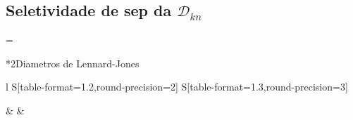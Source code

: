 \documentclass[\mainfilename]{subfiles}
\begin{document}
\begin{sectionBox}
    \subsection*{Seletividade de sep da \(\mathscr{D}_{kn}\)} %
    
    \begin{BM}
        \alpha
        =
    \end{BM}
    
\end{sectionBox}

\begin{sectionBox}*2{Diametros de Lennard-Jones} %
    
    \begin{center}
        \vspace{1ex}
        \begin{tabular}{
            l
            S[table-format=1.2,round-precision=2]
            S[table-format=1.3,round-precision=3]
        }
            \toprule
            
                & 
                & 
            
            \\\midrule
            

\end{tabular}
\end{center}
\end{sectionBox}
\end{document}
